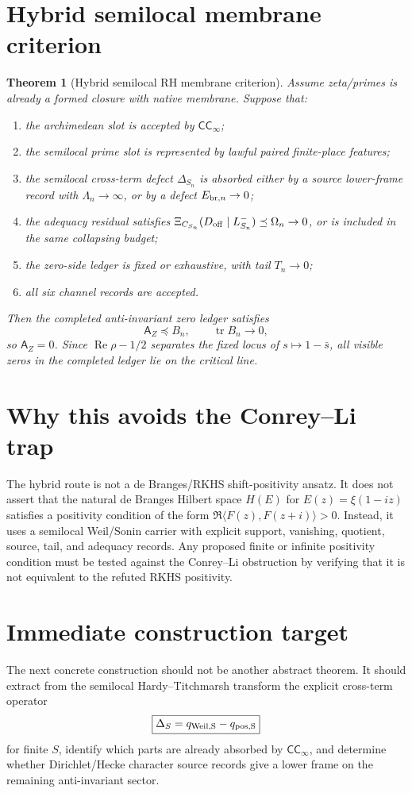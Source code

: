 \documentclass[11pt]{article}
\newtheorem{theorem}{Theorem}
\newcommand{\AZ}{\mathsf A_Z}
\newcommand{\CC}{\mathsf{CC}_\infty}
\begin{document}
\section{Hybrid semilocal membrane criterion}
\begin{theorem}[Hybrid semilocal RH membrane criterion]
Assume zeta/primes is already a formed closure with native membrane.  Suppose that:
\begin{enumerate}[label=H\arabic*.]
\item the archimedean slot is accepted by \(\CC\);
\item the semilocal prime slot is represented by lawful paired finite-place features;
\item the semilocal cross-term defect \(\Delta_{S_n}\) is absorbed either by a source lower-frame record with \(\Lambda_n\to\infty\), or by a defect \(E_{{\rm br},n}\to0\);
\item the adequacy residual satisfies \(\Xi_{C_{S_n}}(D_{\rm off}\mid L_{S_n}^-)\preceq \Omega_n\to0\), or is included in the same collapsing budget;
\item the zero-side ledger is fixed or exhaustive, with tail \(T_n\to0\);
\item all six channel records are accepted.
\end{enumerate}
Then the completed anti-invariant zero ledger satisfies
\[
\AZ\preceq B_n,
\qquad \operatorname{tr}B_n\to0,
\]
so \(\AZ=0\).  Since \(\operatorname{Re}\rho-1/2\) separates the fixed locus of \(s\mapsto1-\bar s\), all visible zeros in the completed ledger lie on the critical line.
\end{theorem}

\section{Why this avoids the Conrey--Li trap}
The hybrid route is not a de Branges/RKHS shift-positivity ansatz.  It does not assert that the natural de Branges Hilbert space \(H(E)\) for \(E(z)=\xi(1-iz)\) satisfies a positivity condition of the form \(\Re\langle F(z),F(z+i)\rangle>0\).  Instead, it uses a semilocal Weil/Sonin carrier with explicit support, vanishing, quotient, source, tail, and adequacy records.  Any proposed finite or infinite positivity condition must be tested against the Conrey--Li obstruction by verifying that it is not equivalent to the refuted RKHS positivity.

\section{Immediate construction target}
The next concrete construction should not be another abstract theorem.  It should extract from the semilocal Hardy--Titchmarsh transform the explicit cross-term operator
\[
\boxed{
\Delta_S=q_{\rm Weil,S}-q_{\rm pos,S}
}
\]
for finite \(S\), identify which parts are already absorbed by \(\CC\), and determine whether Dirichlet/Hecke character source records give a lower frame on the remaining anti-invariant sector.
\end{document}
